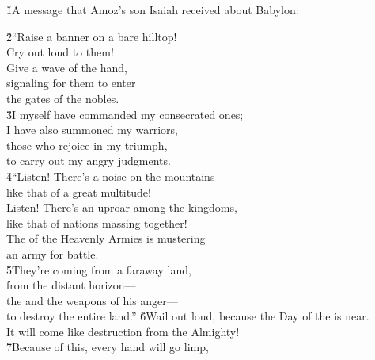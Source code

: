 \v{1}A message that Amoz's son Isaiah received about Babylon:

\begin{poetry}
\poeml \v{2}``Raise a banner on a bare hilltop! \\
\poemll    Cry out loud to them! \\
\poeml Give a wave of the hand, \\
\poemll    signaling for them to enter \\
\poemlll       the gates of the nobles. \\
\poeml \v{3}I myself have commanded my consecrated ones; \\
\poemll    I have also summoned my warriors, \\
\poeml those who rejoice in my triumph, \\
\poemll    to carry out my angry judgments. \\
\poeml \v{4}``Listen! There's a noise on the mountains \\
\poemll    like that of a great multitude! \\
\poeml Listen! There's an uproar among the kingdoms, \\
\poemll    like that of nations massing together! \\
\poeml The  of the Heavenly Armies is mustering \\
\poemll    an army for battle. \\
\poeml \v{5}They're coming from a faraway land, \\
\poemll    from the distant horizon--- \\
\poeml the  and the weapons of his anger--- \\
\poemll    to destroy the entire land.''
\poeml \v{6}Wail out loud, because the Day of the  is near. \\
\poemll    It will come like destruction from the Almighty! \\
\poeml \v{7}Because of this, every hand will go limp, \\

\end{poetry}
